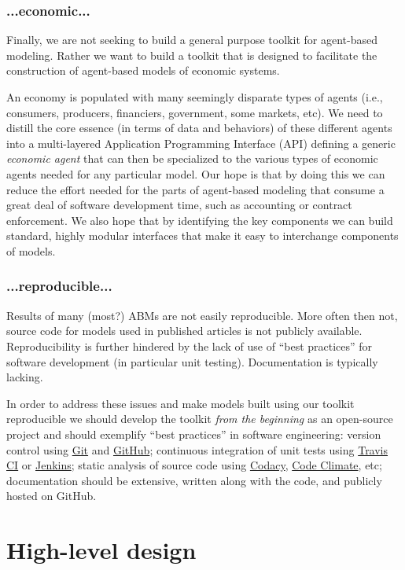 \documentclass[11pt]{amsart}
\begin{document}
\subsubsection{...economic...}
Finally, we are not seeking to build a general purpose toolkit for agent-based modeling. Rather we want to build a toolkit that is designed to facilitate the construction of agent-based models of economic systems.

An economy is populated with many seemingly disparate types of agents (i.e., consumers, producers, financiers, government, some markets, etc). We need to distill the core essence (in terms of data and behaviors) of these different agents into a multi-layered Application Programming Interface (API) defining a generic \textit{economic agent} that can then be specialized to the various types of economic agents needed for any particular model. Our hope is that by doing this we can reduce the effort needed for the parts of agent-based modeling that consume a great deal of software development time, such as accounting or contract enforcement.  We also hope that by identifying the key components we can build standard, highly modular interfaces that make it easy to interchange components of models.

\subsubsection{...reproducible...}
Results of many (most?) ABMs are not easily reproducible. More often then not, source code for models used in published articles is not publicly available. Reproducibility is further hindered by the lack of use of ``best practices'' for software development (in particular unit testing). Documentation is typically lacking. 

In order to address these issues and make models built using our toolkit reproducible we should develop the toolkit \textit{from the beginning} as an open-source project and should exemplify ``best practices'' in software engineering: version control using \href{https://git-scm.com/}{Git} and \href{https://github.com/}{GitHub}; continuous integration of unit tests using \href{https://travis-ci.org/}{Travis CI} or \href{https://jenkins-ci.org/}{Jenkins}; static analysis of source code using \href{https://www.codacy.com/login}{Codacy}, \href{https://codeclimate.com/}{Code Climate}, etc; documentation should be extensive, written along with the code, and publicly hosted on GitHub.   
    
\section{High-level design}
\end{document}
